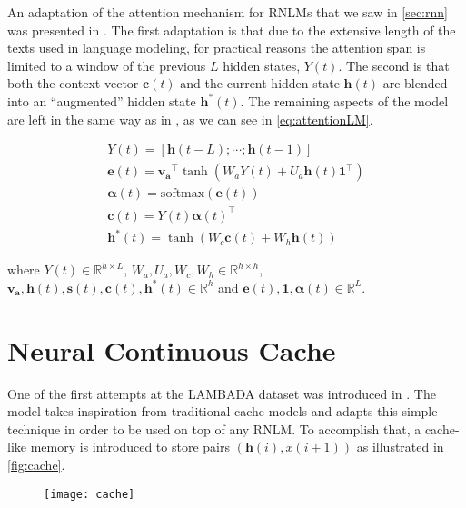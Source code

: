 An adaptation of the attention mechanism for RNLMs that we saw in \ref{sec:rnn} was presented in \cite{daniluk2017frustratingly}. The first adaptation is that due to the extensive length of the texts used in language modeling, for practical reasons the attention span is limited to a window of the previous $L$ hidden states, $Y(t)$. The second is that both the context vector $\mathbf{c}(t)$ and the current hidden state $\mathbf{h}(t)$ are blended into an ``augmented'' hidden state $\mathbf{h^*}(t)$. The remaining aspects of the model are left in the same way as in \cite{bahdanau2014neural}, as we can see in \autoref{eq:attentionLM}.

\begin{equation} \label{eq:attentionLM}
	\begin{gathered}
		Y(t) = [\mathbf{h}(t-L) ; \cdots ; \mathbf{h}(t-1)] \\
		\mathbf{e}(t) = \mathbf{v_a}^{\top} \tanh(W_a Y(t) + U_a\mathbf{h}(t)\mathbf{1}^{\top}) \\
		\boldsymbol{\alpha}(t) = \text{softmax}(\mathbf{e}(t)) \\
		\mathbf{c}(t) = Y(t)\boldsymbol{\alpha}(t)^{\top} \\
		\mathbf{h^*}(t) = \tanh(W_c \mathbf{c}(t) + W_h \mathbf{h}(t))
	\end{gathered}	
\end{equation}

where $Y(t) \in \mathbb{R}^{h \times L}$, $W_a,U_a,W_c,W_h \in \mathbb{R}^{h \times h}$, $\mathbf{v_a},\mathbf{h}(t),\mathbf{s}(t),\mathbf{c}(t),\mathbf{h^*}(t) \in \mathbb{R}^{h}$ and $\mathbf{e}(t), \mathbf{1}, \boldsymbol{\alpha}(t) \in \mathbb{R}^{L}$.

\section{Neural Continuous Cache}
\label{sec:continuousCache}

One of the first attempts at the LAMBADA dataset was introduced in \cite{grave2016improving}. The model takes inspiration from traditional cache models \cite{kuhn1990cache} and adapts this simple technique in order to be used on top of any RNLM. To accomplish that, a cache-like memory is introduced to store pairs $(\mathbf{h}(i),x(i+1))$ as illustrated in \autoref{fig:cache}.

\begin{figure}[H]
	\centering
	\texttt{[image: cache]}
	\label{fig:cache}
\end{figure}

